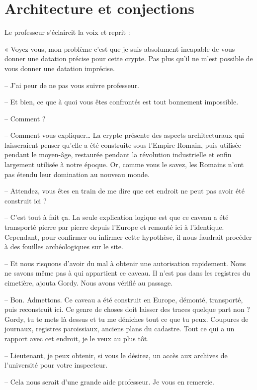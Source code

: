 \chapter[Architecture et conjections]{Architecture et conjections}
Le professeur s'éclaircit la voix et reprit :

« Voyez-vous, mon problème c'est que je suis absolument incapable de vous donner une datation précise pour cette crypte.
Pas plus qu'il ne m'est possible de vous donner une datation imprécise.

-- J'ai peur de ne pas vous suivre professeur.

-- Et bien, ce que à quoi vous êtes confrontés est tout bonnement impossible.

-- Comment ?

-- Comment vous expliquer\ldots{} La crypte présente des aspects architecturaux qui laisseraient penser qu'elle a été
construite sous l'Empire Romain, puis utilisée pendant le moyen-âge, restaurée pendant la révolution industrielle et
enfin largement utilisée à notre époque. Or, comme vous le savez, les Romains n'ont pas étendu leur domination au
nouveau monde.

-- Attendez, vous êtes en train de me dire que cet endroit ne peut pas avoir été construit ici ?

-- C'est tout à fait ça. La seule explication logique est que ce caveau a été transporté pierre par pierre depuis
l'Europe et remonté ici à l'identique. Cependant, pour confirmer ou infirmer cette hypothèse, il nous faudrait procéder
à des fouilles archéologiques sur le site.

-- Et nous risquons d'avoir du mal à obtenir une autorisation rapidement. Nous ne savons même pas à qui appartient ce
caveau. Il n'est pas dans les registres du cimetière, ajouta Gordy. Nous avons vérifié au passage.

-- Bon. Admettons. Ce caveau a été construit en Europe, démonté, transporté, puis reconstruit ici. Ce genre de choses
doit laisser des traces quelque part non ? Gordy, tu te mets là dessus et tu me déniches tout ce que tu peux. Coupures
de journaux, registres paroissiaux, anciens plans du cadastre. Tout ce qui a un rapport avec cet endroit, je le veux au
plus tôt.

-- Lieutenant, je peux obtenir, si vous le désirez, un accès aux archives de l'université pour votre inspecteur.

-- Cela nous serait d'une grande aide professeur. Je vous en remercie.

